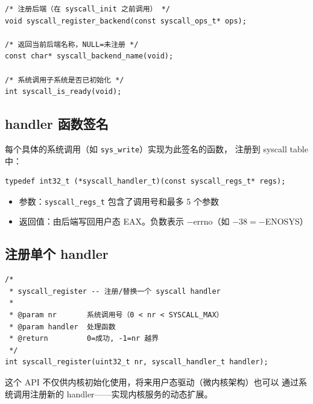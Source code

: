 \begin{lstlisting}[style=cstyle]
/* 注册后端（在 syscall_init 之前调用） */
void syscall_register_backend(const syscall_ops_t* ops);

/* 返回当前后端名称，NULL=未注册 */
const char* syscall_backend_name(void);

/* 系统调用子系统是否已初始化 */
int syscall_is_ready(void);
\end{lstlisting}

\subsection{handler 函数签名}

每个具体的系统调用（如 \texttt{sys\_write}）实现为此签名的函数，
注册到 syscall table 中：

\begin{lstlisting}[style=cstyle]
typedef int32_t (*syscall_handler_t)(const syscall_regs_t* regs);
\end{lstlisting}

\begin{itemize}
  \item 参数：\texttt{syscall\_regs\_t} 包含了调用号和最多 5 个参数
  \item 返回值：由后端写回用户态 EAX。负数表示 $-$errno（如 $-38 = -$ENOSYS）
\end{itemize}

\subsection{注册单个 handler}

\begin{lstlisting}[style=cstyle]
/*
 * syscall_register -- 注册/替换一个 syscall handler
 *
 * @param nr       系统调用号（0 < nr < SYSCALL_MAX）
 * @param handler  处理函数
 * @return         0=成功, -1=nr 越界
 */
int syscall_register(uint32_t nr, syscall_handler_t handler);
\end{lstlisting}

这个 API 不仅供内核初始化使用，将来用户态驱动（微内核架构）也可以
通过系统调用注册新的 handler——实现内核服务的动态扩展。
